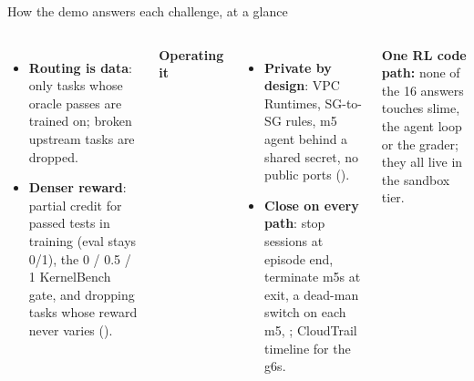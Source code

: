\begin{frame}{How the demo answers each challenge, at a glance}
\begin{columns}[T]
\begin{itemize}
\item[13] \textbf{Routing is data}: only tasks whose oracle passes are trained on; broken upstream tasks are dropped.
\item[14] \textbf{Denser reward}: partial credit for passed tests in training (eval stays 0/1), the 0 / 0.5 / 1 KernelBench gate, and dropping tasks whose reward never varies ().
\end{itemize}
\textbf{\footnotesize Operating it}
\begin{itemize}\tiny\setlength{\itemsep}{0.3mm}
\item[15] \textbf{Private by design}: VPC Runtimes, SG-to-SG rules, m5 agent behind a shared secret, no public ports ().
\item[16] \textbf{Close on every path}: stop sessions at episode end, terminate m5s at exit, a dead-man switch on each m5, ; CloudTrail timeline for the g6s.
\end{itemize}
\vspace{1mm}
\colorbox{panel}{\parbox{\dimexpr\linewidth-2\fboxsep}{\scriptsize\textbf{One RL code path:} none of the 16 answers touches slime, the agent loop or the grader; they all live in the sandbox tier.}}
\end{columns}
\end{frame}


